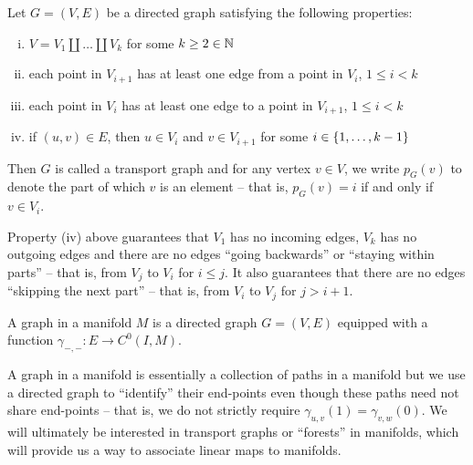 \documentclass[./Thick_TQFTs_and_Quantum_Information.tex]{subfiles}
\begin{document}
\begin{defn}
Let $G = (V, E)$ be a directed graph satisfying the following properties:
\begin{enumerate}[(i)]
\setlength{\itemsep}{0pt}
\item $V = V_1 \amalg \dots \amalg V_k$ for some $k \geq 2 \in \mathbb{N}$
\item each point in $V_{i + 1}$ has at least one edge from a point in $V_{i}$,
$1 \leq i < k$
\item each point in $V_{i}$ has at least one edge to a point in $V_{i + 1}$,
$1 \leq i < k$
\item if $(u, v) \in E$, then $u \in V_i$ and $v \in V_{i + 1}$ for some
$i \in \set{1, \dots, k - 1}$
\end{enumerate}
Then $G$ is called a transport graph and for any vertex $v \in V$, we write
$p_{G}(v)$ to denote the part of which $v$ is an element -- that is,
$p_G(v) = i$ if and only if $v \in V_i$.
\end{defn}

\begin{rmk}
Property (iv) above guarantees that $V_1$ has no incoming edges, $V_k$ has no
outgoing edges and there are no edges ``going backwards'' or ``staying within
parts'' -- that is, from $V_j$ to $V_i$ for $i \leq j$. It also guarantees that
there are no edges ``skipping the next part'' -- that is, from $V_i$ to
$V_j$ for $j > i + 1$.
\end{rmk}

\begin{defn}
A graph in a manifold $M$ is a directed graph $G = (V, E)$ equipped with a
function $\gamma_{-, -} : E \to C^0(I, M)$.
\end{defn}

\begin{rmk}
A graph in a manifold is essentially a collection of paths in a manifold but we
use a directed graph to ``identify'' their end-points even though these paths
need not share end-points -- that is, we do not strictly require
$\gamma_{u, v}(1) = \gamma_{v, w}(0)$. We will ultimately be interested in
transport graphs or ``forests'' in manifolds, which will provide us a way to
associate linear maps to manifolds.
\end{rmk}
\end{document}
